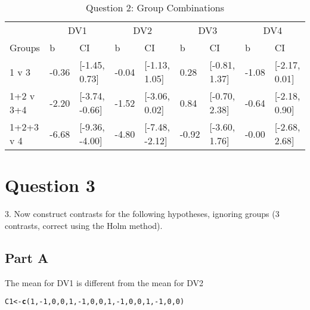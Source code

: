 \documentclass{article}\usepackage[]{graphicx}\usepackage[]{color}
\makeatletter
\newcommand{\hlnum}[1]{\textcolor[rgb]{0.686,0.059,0.569}{#1}}%
\newcommand{\hlopt}[1]{\textcolor[rgb]{0,0,0}{#1}}%
\newcommand{\hlstd}[1]{\textcolor[rgb]{0.345,0.345,0.345}{#1}}%
\newcommand{\hlkwb}[1]{\textcolor[rgb]{0.69,0.353,0.396}{#1}}%
\newcommand{\hlkwd}[1]{\textcolor[rgb]{0.737,0.353,0.396}{\textbf{#1}}}%
\newenvironment{kframe}{%
 \def\at@end@of@kframe{}%
 \ifinner\ifhmode%
  \def\at@end@of@kframe{\end{minipage}}%
  \begin{minipage}{\columnwidth}%
 \fi\fi%
 \def\FrameCommand##1{\hskip\@totalleftmargin \hskip-\fboxsep
 \colorbox{shadecolor}{##1}\hskip-\fboxsep
     \hskip-\linewidth \hskip-\@totalleftmargin \hskip\columnwidth}%
 \MakeFramed {\advance\hsize-\width
   \@totalleftmargin\z@ \linewidth\hsize
   \@setminipage}}%
 {\par\unskip\endMakeFramed%
 \at@end@of@kframe}
\newenvironment{knitrout}{}{} %
\makeatother
\begin{document}
\begin{knitrout}
\begin{table}
\caption{\label{tab:unnamed-chunk-10}Question 2: Group Combinations}
\centering
\begin{tabular}[t]{lllllllll}
\toprule
\multicolumn{1}{c}{ } & \multicolumn{2}{c}{DV1} & \multicolumn{2}{c}{DV2} & \multicolumn{2}{c}{DV3} & \multicolumn{2}{c}{DV4} \\
\cmidrule(l{2pt}r{2pt}){2-3} \cmidrule(l{2pt}r{2pt}){4-5} \cmidrule(l{2pt}r{2pt}){6-7} \cmidrule(l{2pt}r{2pt}){8-9}
Groups & b & CI & b & CI & b & CI & b & CI\\
\midrule
1 v 3 & -0.36 & [-1.45, 0.73] & -0.04 & [-1.13, 1.05] & 0.28 & [-0.81, 1.37] & -1.08 & [-2.17, 0.01]\\
1+2 v 3+4 & -2.20 & [-3.74, -0.66] & -1.52 & [-3.06, 0.02] & 0.84 & [-0.70, 2.38] & -0.64 & [-2.18, 0.90]\\
1+2+3 v 4 & -6.68 & [-9.36, -4.00] & -4.80 & [-7.48, -2.12] & -0.92 & [-3.60, 1.76] & -0.00 & [-2.68, 2.68]\\
\bottomrule
\end{tabular}
\end{table}


\end{knitrout}


\section{Question 3}
3. Now construct contrasts for the following hypotheses, ignoring groups (3 contrasts, correct using the Holm method).

\subsection{Part A}
The mean for DV1 is different from the mean for DV2
\begin{knitrout}
\color{fgcolor}\begin{kframe}
\begin{alltt}
\hlstd{C1} \hlkwb{<-} \hlkwd{c}\hlstd{(}\hlnum{1}\hlstd{,}\hlopt{-}\hlnum{1}\hlstd{,}\hlnum{0}\hlstd{,}\hlnum{0}\hlstd{,} \hlnum{1}\hlstd{,}\hlopt{-}\hlnum{1}\hlstd{,}\hlnum{0}\hlstd{,}\hlnum{0}\hlstd{,} \hlnum{1}\hlstd{,}\hlopt{-}\hlnum{1}\hlstd{,}\hlnum{0}\hlstd{,}\hlnum{0}\hlstd{,} \hlnum{1}\hlstd{,}\hlopt{-}\hlnum{1}\hlstd{,}\hlnum{0}\hlstd{,}\hlnum{0}\hlstd{)}
\end{alltt}
\end{kframe}
\end{knitrout}
\end{document}
